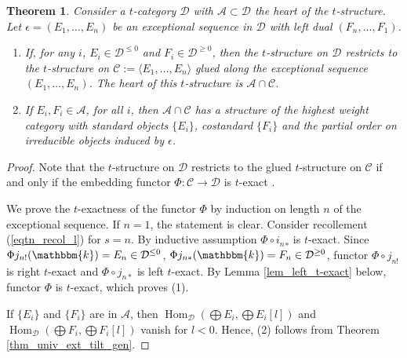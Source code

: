 \documentclass[12pt,a4paper]{amsart}
\newcommand{\aA}{{\mathcal{A}}}
\newcommand{\cC}{{\mathcal{C}}}
\newcommand{\dD}{{\mathcal{D}}}
\newcommand{\kk}{\mathbbm{k}}
\newcommand{\tr}{{\mbox{$t$-struc}\-tu\-r}}
\newcommand{\Hom}{\mathop{\textrm{Hom}}\nolimits}
\newtheorem{THM}[LEM]{Theorem}
\theoremstyle{definition}
\begin{document}
\begin{THM}\label{thm_general}
	Consider a $t$-category $\dD$ with $\aA \subset \dD$ the heart of the \tr e. Let $\epsilon =(E_1,\ldots, E_n)$ be an exceptional sequence in $\dD$ with left dual $(F_n,\ldots, F_1)$. 
	\begin{enumerate}
		\item If, for any $i$, $E_i\in \dD^{\leq 0}$ and $F_i \in \dD^{\geq 0}$, then the \tr e on $\dD$ restricts to the  	\tr e on $\cC:= \langle E_1,\ldots,E_n\rangle$ glued along the exceptional sequence $(E_1,\ldots, E_n)$. The heart of this \tr e is $\aA \cap \cC$. 
		\item If $E_i, F_i\in \aA$, for all $i$, then $\aA\cap \cC$
		has a structure of the highest weight category with standard objects $\{E_i\}$, costandard $\{F_i\}$ and the partial order on irreducible objects induced by $\epsilon$.
	\end{enumerate}
\end{THM}
\begin{proof}
	Note that the \tr e on $\dD$ restricts to the glued \tr e on $\cC$ if and only if the embedding functor $\Phi \colon \cC\to \dD$ is $t$-exact \cite[1.3.19]{BBD}.
	
	We prove the $t$-exactness of the functor $\Phi$ by induction on length $n$ of the exceptional sequence. If $n=1$, the statement is clear. Consider recollement (\ref{eqtn_recol_l}) for $s=n$.  By inductive assumption $\Phi\circ {i_n}_*$ is $t$-exact. Since $\Phi j_{n!}(\kk) = E_n \in \dD^{\leq 0}$, $\Phi j_{n*}(\kk) = F_n \in\dD^{\geq 0}$, functor $\Phi\circ j_{n!}$ is right $t$-exact and $\Phi\circ j_{n*}$ is left $t$-exact. By Lemma \ref{lem_left_t-exact} below, functor $\Phi$ is $t$-exact, which proves (1).
	
	If $\{E_i\}$ and $\{F_i\}$ are in $\aA$, then $\Hom_{\dD}(\bigoplus E_i, \bigoplus E_i[l])$ and $\Hom_{\dD}(\bigoplus F_i, \bigoplus F_i[l])$ vanish for $l<0$. Hence, (2) follows from Theorem \ref{thm_univ_ext_tilt_gen}. 
\end{proof}
\end{document}
